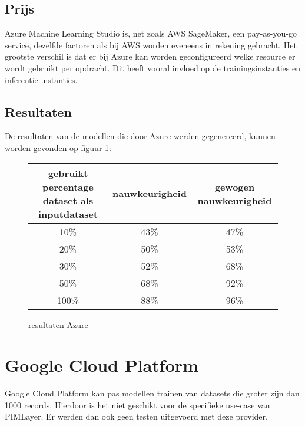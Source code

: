 \section{Prijs}
Azure Machine Learning Studio is, net zoals AWS SageMaker, een pay-as-you-go service, dezelfde factoren als bij AWS worden eveneens in rekening gebracht. Het grootste verschil is dat er bij Azure kan worden geconfigureerd welke resource er wordt gebruikt per opdracht. Dit heeft vooral invloed op de trainingsinstanties en inferentie-instanties. 
\section{Resultaten}
De resultaten van de modellen die door Azure werden gegenereerd, kunnen worden gevonden op figuur \ref{AzureResultTable}:
 \begin{figure}[h]
    \caption{resultaten Azure}
    \label{AzureResultTable}
\begin{center}
    \begin{tabular} {|c | c | c |}
        \hline
        gebruikt percentage dataset als inputdataset & nauwkeurigheid & gewogen nauwkeurigheid \\
        \hline
        10\% & 43\% & 47\% \\
        \hline
        20\% & 50\% & 53\% \\
        \hline
        30\% & 52\% & 68\% \\
        \hline
        50\% & 68\% & 92\% \\
        \hline
        100\% & 88\% & 96\% \\
        \hline
    \end{tabular}
\end{center}
\end{figure}
\chapter{Google Cloud Platform}
Google Cloud Platform kan pas modellen trainen van datasets die groter zijn dan 1000 records. Hierdoor is het niet geschikt voor de specifieke use-case van PIMLayer. Er werden dan ook geen testen uitgevoerd met deze provider.


